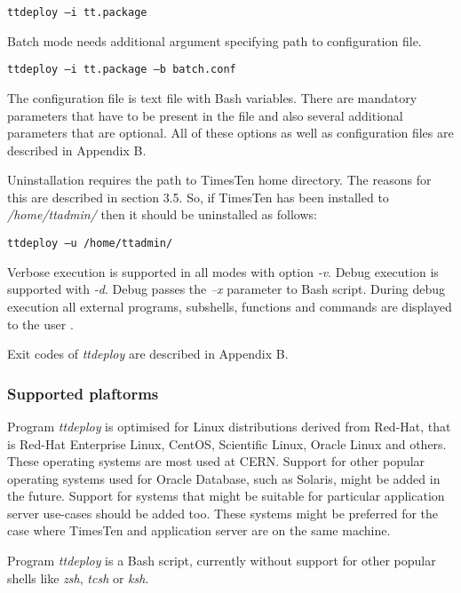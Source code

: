 \documentclass[11pt, letterpaper]{article}
\begin{document}
\begin{lstlisting}
ttdeploy –i tt.package
\end{lstlisting}

Batch mode needs additional argument specifying path to configuration file.

\begin{lstlisting}
ttdeploy –i tt.package –b batch.conf
\end{lstlisting}

The configuration file is text file with Bash variables. There are mandatory parameters that have to be present in the file and also several additional parameters that are optional. All of these options as well as configuration files are described in Appendix B.

Uninstallation requires the path to TimesTen home directory. The reasons for this are described in section 3.5. So, if TimesTen has been installed to \emph{/home/ttadmin/} then it should be uninstalled as follows:

\begin{lstlisting}
ttdeploy –u /home/ttadmin/
\end{lstlisting}

Verbose execution is supported in all modes with option \emph{-v}. Debug execution is supported with \emph{-d}. Debug passes the \emph{–x} parameter to Bash script. During debug execution all external programs, subshells, functions and commands are displayed to the user \cite{ref_bashman}.

Exit codes of \emph{ttdeploy} are described in Appendix B.

\subsubsection{Supported plaftorms}

Program \emph{ttdeploy} is optimised for Linux distributions derived from Red-Hat, that is Red-Hat Enterprise Linux, CentOS, Scientific Linux, Oracle Linux and others. These operating systems are most used at CERN. Support for other popular operating systems used for Oracle Database, such as Solaris, might be added in the future. Support for systems that might be suitable for particular application server use-cases should be added too. These systems might be preferred for the case where TimesTen and application server are on the same machine.

Program \emph{ttdeploy} is a Bash script, currently without support for other popular shells like \emph{zsh}, \emph{tcsh} or \emph{ksh}.
\end{document}
